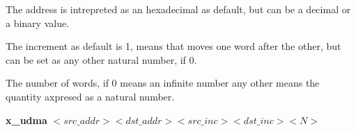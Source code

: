 \documentclass{article}
\begin{document}
The address is intrepreted as an hexadecimal as default, but can be a decimal or a binary value.

The increment as default is 1, means that moves one word after the other, but can be set as any other natural number, if 0. 

The number of words, if 0 means an infinite number any other means the quantity axpresed as a natural number.

\vspace{5mm}

\textbf{x\_udma} $<src\_addr> <dst\_addr> <src\_inc> <dst\_inc> <N> $

\vspace{5mm}
\end{document}
